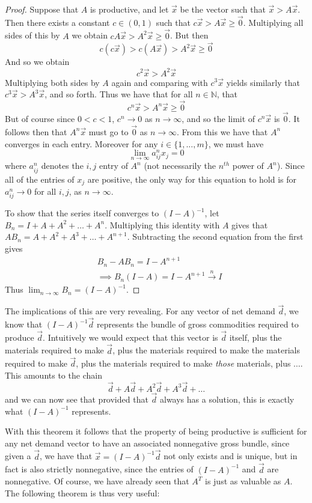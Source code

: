 \documentclass{article}
\theoremstyle{definition}
\theoremstyle{plain}
\theoremstyle{theorem}
\begin{document}
\begin{proof}
	Suppose that $A$ is productive, and let $\vec{x}$ be the vector such that $\vec{x} > A\vec{x}$. Then there exists a constant $c \in (0,1)$ such that $c\vec{x} > A\vec{x} \geq \vec{0}$. Multiplying all sides of this by $A$ we obtain $cA\vec{x} > A^2\vec{x} \geq \vec{0}$. But then 
\[ c(c\vec{x}) > c(A\vec{x}) > A^2\vec{x} \geq \vec{0} \]
And so we obtain
\[ c^2\vec{x} > A^2\vec{x} \]
Multiplying both sides by $A$ again and comparing with $c^3\vec{x}$ yields similarly that $c^3\vec{x} > A^3\vec{x}$, and so forth. Thus we have that for all $n \in \mathbb{N}$, that 
\[ c^n \vec{x} > A^n\vec{x} \geq \vec{0} \] 
But of course since $0 < c < 1$, $c^n \to 0$ as $n \to \infty$, and so the limit of $c^n\vec{x}$ is $\vec{0}$. It follows then that $A^n\vec{x}$ must go to $\vec{0}$ as $n \to \infty$. From this we have that $A^n$ converges in each entry. Moreover for any $i \in \{1,...,m\}$, we must have
\[ \lim_{n\to\infty} a^n_{ij}x_j = 0 \]
where $a^n_{ij}$ denotes the $i,j$ entry of $A^n$ (not necessarily the $n^{th}$ power of $A^n$). Since all of the entries of $x_j$ are positive, the only way for this equation to hold is for $a^n_{ij} \to 0$ for all $i,j$, as $n \to \infty$. \par 
To show that the series itself converges to $(I-A)^{-1}$, let $B_n = I+A+A^2+\ldots + A^n$. Multiplying this identity with $A$ gives that $AB_n = A+A^2+A^3 + \ldots + A^{n+1}$. Subtracting the second equation from the first gives
\begin{align*}
	& B_n - AB_n = I-A^{n+1} \\
	&\implies B_n(I-A) = I-A^{n+1} \overset{n}\to I
\end{align*}
Thus $\lim_{n\to\infty}B_n = (I-A)^{-1}$. 
\end{proof}
The implications of this are very revealing. For any vector of net demand $\vec{d}$, we know that $(I-A)^{-1}\vec{d}$ represents the bundle of gross commodities required to produce $\vec{d}$. Intuitively we would expect that this vector is $\vec{d}$ itself, plus the materials required to make $\vec{d}$, plus the materials required to make the materials required to make $\vec{d}$, plus the materials required to make \emph{those} materials, plus $\ldots$. This amounts to the chain 
\[ \vec{d} + A\vec{d} + A^2\vec{d} + A^3\vec{d} + \ldots \]
and we can now see that provided that $\vec{d}$ always has a solution, this is exactly what $(I-A)^{-1}$ represents.  \par 
With this theorem it follows that the property of being productive is sufficient for any net demand vector to have an associated nonnegative gross bundle, since given a $\vec{d}$, we have that $\vec{x} = (I-A)^{-1}\vec{d}$ not only exists and is unique, but in fact is also strictly nonnegative, since the entries of $(I-A)^{-1}$ and $\vec{d}$ are nonnegative. Of course, we have already seen that $A^T$ is just as valuable as $A$. The following theorem is thus very useful:
\end{document}
